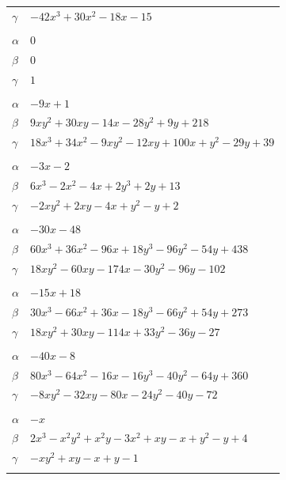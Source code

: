 \documentclass[11pt]{article}
\begin{document}
\begin{longtable}{@{}ll@{}}
$\gamma$ & $-42x^{3}+30x^{2}-18x-15$\\
\addlinespace[3pt]
\multicolumn{2}{@{}l}{$\{i,j\}=\{0,185\}$, $k_{ij}=3\cdot 5^{2}$}\\
$\alpha$ & $0$\\
$\beta$ & $0$\\
$\gamma$ & $1$\\
\addlinespace[3pt]
\multicolumn{2}{@{}l}{$\{i,j\}=\{1,7\}$, $k_{ij}=2\cdot 7\cdot 13$}\\
$\alpha$ & $-9x+1$\\
$\beta$ & $9xy^{2}+30xy-14x-28y^{2}+9y+218$\\
$\gamma$ & $18x^{3}+34x^{2}-9xy^{2}-12xy+100x+y^{2}-29y+39$\\
\addlinespace[3pt]
\multicolumn{2}{@{}l}{$\{i,j\}=\{1,9\}$, $k_{ij}=7$}\\
$\alpha$ & $-3x-2$\\
$\beta$ & $6x^{3}-2x^{2}-4x+2y^{3}+2y+13$\\
$\gamma$ & $-2xy^{2}+2xy-4x+y^{2}-y+2$\\
\addlinespace[3pt]
\multicolumn{2}{@{}l}{$\{i,j\}=\{1,11\}$, $k_{ij}=2\cdot 3\cdot 7^{2}$}\\
$\alpha$ & $-30x-48$\\
$\beta$ & $60x^{3}+36x^{2}-96x+18y^{3}-96y^{2}-54y+438$\\
$\gamma$ & $18xy^{2}-60xy-174x-30y^{2}-96y-102$\\
\addlinespace[3pt]
\multicolumn{2}{@{}l}{$\{i,j\}=\{1,14\}$, $k_{ij}=3\cdot 7\cdot 13$}\\
$\alpha$ & $-15x+18$\\
$\beta$ & $30x^{3}-66x^{2}+36x-18y^{3}-66y^{2}+54y+273$\\
$\gamma$ & $18xy^{2}+30xy-114x+33y^{2}-36y-27$\\
\addlinespace[3pt]
\multicolumn{2}{@{}l}{$\{i,j\}=\{1,17\}$, $k_{ij}=2^{4}\cdot 3\cdot 7$}\\
$\alpha$ & $-40x-8$\\
$\beta$ & $80x^{3}-64x^{2}-16x-16y^{3}-40y^{2}-64y+360$\\
$\gamma$ & $-8xy^{2}-32xy-80x-24y^{2}-40y-72$\\
\addlinespace[3pt]
\multicolumn{2}{@{}l}{$\{i,j\}=\{1,20\}$, $k_{ij}=2^{2}$}\\
$\alpha$ & $-x$\\
$\beta$ & $2x^{3}-x^{2}y^{2}+x^{2}y-3x^{2}+xy-x+y^{2}-y+4$\\
$\gamma$ & $-xy^{2}+xy-x+y-1$\\
\addlinespace[3pt]

\end{longtable}
\end{document}
